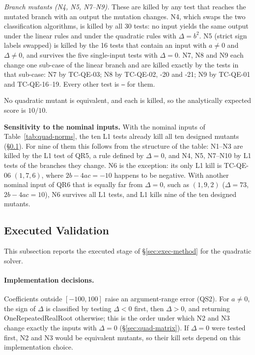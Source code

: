\documentclass[11pt,a4paper]{article}
\begin{document}
\emph{Branch mutants (N4, N5, N7--N9).} These are killed by any test that
reaches the mutated branch with an output the mutation changes. N4, which
swaps the two classification algorithms, is killed by all 30 tests: no input
yields the same output under the linear rules and under the quadratic rules
with \(\Delta=b^2\). N5 (strict sign labels swapped) is killed by the 16
tests that contain an input with \(a\ne0\) and \(\Delta\ne0\), and survives
the five single-input tests with \(\Delta=0\). N7, N8 and N9 each change one
sub-case of the linear branch and are killed exactly by the tests in that
sub-case: N7 by TC-QE-03; N8 by TC-QE-02, -20 and -21; N9 by TC-QE-01 and
TC-QE-16--19. Every other test is \texttt{--} for them.

No quadratic mutant is equivalent, and each is killed, so the analytically
expected score is \(10/10\).

\textbf{Sensitivity to the nominal inputs.} With the nominal inputs of
Table~\ref{tab:quad-norms}, the ten L1 tests already kill all ten designed
mutants (\S\ref{sec:quad-exec}). For nine of them this follows from the
structure of the table: N1--N3 are killed by the L1 test of QR5, a rule
defined by \(\Delta=0\), and N4, N5, N7--N10 by L1 tests of the branches they
change. N6 is the exception: its only L1 kill is TC-QE-06 \((1,7,6)\), where
\(2b-4ac=-10\) happens to be negative. With another nominal input of QR6 that
is equally far from \(\Delta=0\), such as \((1,9,2)\) (\(\Delta=73\),
\(2b-4ac=10\)), N6 survives all L1 tests, and L1 kills nine of the ten
designed mutants.
\subsection{Executed Validation}
\label{sec:quad-exec}

This subsection reports the executed stage of \S\ref{sec:exec-method} for the
quadratic solver.

\paragraph{Implementation decisions.} Coefficients outside \([-100,100]\)
raise an argument-range error (QS2). For \(a\ne0\), the sign of \(\Delta\) is
classified by testing \(\Delta<0\) first, then \(\Delta>0\), and returning
OneRepeatedRealRoot otherwise; this is the order under which N2 and N3 change
exactly the inputs with \(\Delta=0\) (\S\ref{sec:quad-matrix}). If \(\Delta=0\) were tested first, N2 and N3 would be equivalent mutants, so their kill sets depend on this implementation choice.
\end{document}
